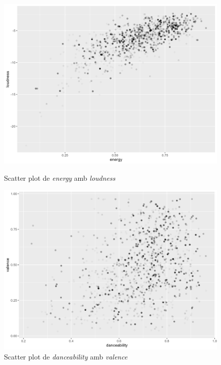\begin{figure}[H]
\centering
    \begin{minipage}{.4\textwidth}
        \centering
        \includegraphics[width=0.95\linewidth]{Images/2_Bivariate/energyloudness.png}
        \caption{Scatter plot de \textit{energy} amb \textit{loudness}}
        \label{fig:BivariateR_energyloud}
    \end{minipage}%
    \begin{minipage}{.4\textwidth}
        \centering
        \includegraphics[width=0.95\linewidth]{Images/2_Bivariate/danceabilityvalence.png}
        \caption{Scatter plot de \textit{danceability} amb \textit{valence}}
        \label{fig:BivariateR_danceval}
    \end{minipage}%
\end{figure}

